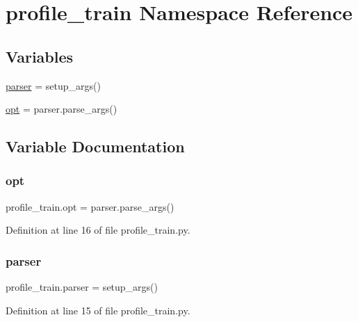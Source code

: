 \hypertarget{namespaceprofile__train}{}\section{profile\+\_\+train Namespace Reference}
\label{namespaceprofile__train}
\subsection*{Variables}
\begin{DoxyCompactItemize}
\item 
\hyperlink{namespaceprofile__train_a82ea6ec33dd7cd781e4e778f9e52112f}{parser} = setup\+\_\+args()
\item 
\hyperlink{namespaceprofile__train_afdda29d62ab3e138ea37cc14c6396a3e}{opt} = parser.\+parse\+\_\+args()
\end{DoxyCompactItemize}


\subsection{Variable Documentation}
\mbox{\label{namespaceprofile__train_afdda29d62ab3e138ea37cc14c6396a3e}} 
\subsubsection{\texorpdfstring{opt}{opt}}
{\footnotesize\ttfamily profile\+\_\+train.\+opt = parser.\+parse\+\_\+args()}



Definition at line 16 of file profile\+\_\+train.\+py.

\mbox{\label{namespaceprofile__train_a82ea6ec33dd7cd781e4e778f9e52112f}} 
\subsubsection{\texorpdfstring{parser}{parser}}
{\footnotesize\ttfamily profile\+\_\+train.\+parser = setup\+\_\+args()}



Definition at line 15 of file profile\+\_\+train.\+py.

